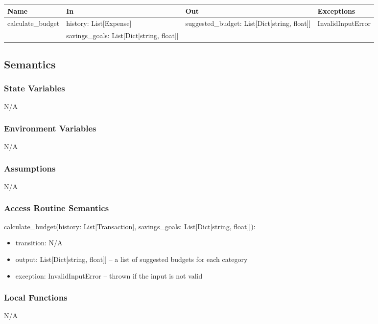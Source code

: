 \documentclass[12pt, titlepage]{article}
\begin{document}
\begin{center}
\begin{tabular}{p{4cm} p{4cm} p{4cm} p{4cm}}
\hline
\textbf{Name} & \textbf{In} & \textbf{Out} & \textbf{Exceptions} \\
\hline
calculate\_budget & history: List[Expense] & suggested\_budget: List[Dict[string, float]]
& InvalidInputError \\
& savings\_goals: List[Dict[string, float]] & &  \\
\hline
\end{tabular}
\end{center}

\subsection{Semantics}

\subsubsection{State Variables}
N/A

\subsubsection{Environment Variables}
N/A

\subsubsection{Assumptions}
N/A

\subsubsection{Access Routine Semantics}

\noindent calculate\_budget(history: List[Transaction], savings\_goals: List[Dict[string, float]]):
\begin{itemize}
\item transition: N/A
\item output: List[Dict[string, float]] -- a list of suggested budgets for each category
\item exception: InvalidInputError -- thrown if the input is not valid
\end{itemize}

\subsubsection{Local Functions}
N/A
\end{document}
